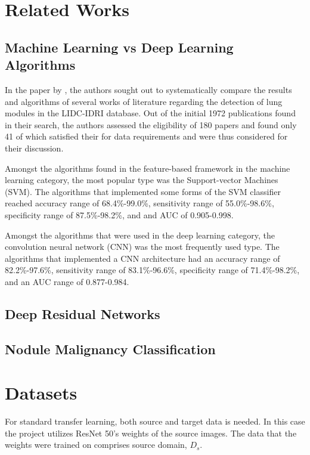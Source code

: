 \documentclass[10pt,twocolumn,letterpaper]{article}
\begin{document}

\section{Related Works} \label{sec:works}

   \subsection{Machine Learning vs Deep Learning Algorithms} \label{sec:related-dl-vs-ml}
      In the paper by \cite{ml_vs_dl}, the authors sought out to systematically compare the results and algorithms of
      several works of literature regarding the detection of lung modules in the LIDC-IDRI database.
      Out of the initial 1972 publications found in their search, the authors assessed the eligibility of 180 papers
      and found only 41 of which satisfied their for data requirements and were thus considered for their discussion.

      Amongst the algorithms found in the feature-based framework in the machine learning category, the most popular
      type was the Support-vector Machines (SVM). The algorithms that implemented some forms of the SVM classifier
      reached accuracy range of 68.4\%-99.0\%, sensitivity range of 55.0\%-98.6\%, specificity range of 87.5\%-98.2\%, and
      and AUC of 0.905-0.998.

      Amongst the algorithms that were used in the deep learning category, the convolution neural network (CNN) was the most
      frequently used type. The algorithms that implemented a CNN architecture had an accuracy range of 82.2\%-97.6\%,
      sensitivity range of 83.1\%-96.6\%, specificity range of 71.4\%-98.2\%, and an AUC range of 0.877-0.984.



   \subsection{Deep Residual Networks} \label{sec:related-deep-residual-networks}


   \subsection{Nodule Malignancy Classification} \label{sec:related-nodulex}


\section{Datasets} \label{sec:data}
   For standard transfer learning, both source and target data is needed. In this case
   the project utilizes ResNet 50's weights of the source images. The data that the weights
   were trained on comprises source domain, $D_s$.
\end{document}

